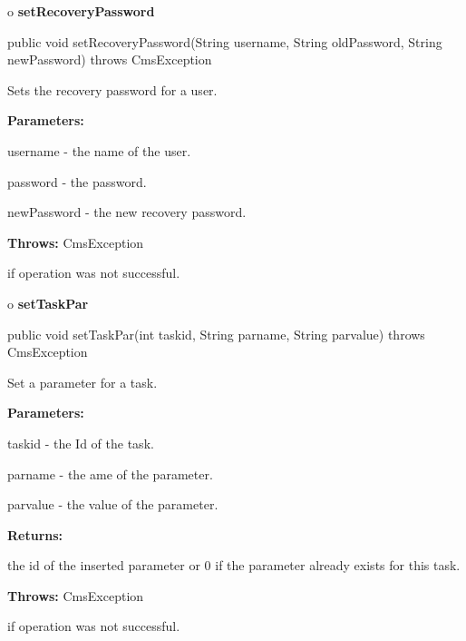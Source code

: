o {\bf setRecoveryPassword} 

\begin{PRE}
 public void setRecoveryPassword(String username,
                                 String oldPassword,
                                 String newPassword) throws CmsException
\end{PRE}

\begin{description}
\htmlDD Sets the recovery password for a user. 

\begin{description}
\item {\bf Parameters:}  

username - the name of the user.  

password - the password.  

newPassword - the new recovery password.  
\item {\bf Throws:} CmsException  

if operation was not successful.  
\end{description}

\end{description}

o {\bf setTaskPar} 

\begin{PRE}
 public void setTaskPar(int taskid,
                        String parname,
                        String parvalue) throws CmsException
\end{PRE}

\begin{description}
\htmlDD Set a parameter for a task. 

\begin{description}
\item {\bf Parameters:}  

taskid - the Id of the task.  

parname - the ame of the parameter.  

parvalue - the value of the parameter.  
\item {\bf Returns:}  

the id of the inserted parameter or 0 if the parameter already exists for this
task.  
\item {\bf Throws:} CmsException  

if operation was not successful.  
\end{description}

\end{description}

